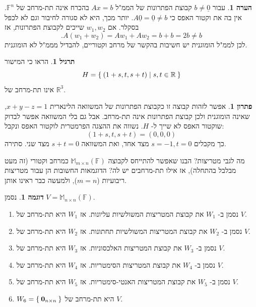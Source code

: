 \documentclass[12pt]{report}
\theoremstyle{plain}
\theoremstyle{definition}
\newtheorem{example}{דוגמה}[chapter]
\newtheorem{exercise}{תרגיל}[chapter]
\newtheorem{remark}{הערה}[chapter]
\newtheorem*{solution}{פתרון}
\newcommand{\R}{\mathbb{R}}
\newcommand{\F}{\mathbb{F}}
\newcommand{\M}{\mathbb{M}}
\newcommand{\0}{\mathbf{0}}
\begin{document}
\begin{remark}
עבור
$b\neq \underline{0}$
קבוצת הפתרונות של הממ"ל
$Ax=b$
בהכרח אינה תת-מרחב של
$\F^n$.
אין בה את וקטור האפס כי
$A\underline{0}=\underline{0}\neq b$.
יותר מכך, היא לא סגורה לחיבור וגם לא לכפל בסקלר. אם
$w_1,w_2$
שייכים לקבוצת הפתרונות, אז
$$
.A(w_1+w_2)=Aw_1+Aw_2=b+b=2b\neq b
$$
לכן לממ"ל הומוגנית יש חשיבות בהקשר של מרחב וקטוריים, להבדיל מממ"ל לא הומוגנית.
\end{remark}

\begin{exercise}
הראו כי המישור
$$
H=\Set{(1+s,t,s+t)|s,t\in\R}
$$
אינו תת-מרחב של
$\R^3$.
\end{exercise}

\begin{solution}
אפשר לזהות קבוצה זו כקבוצת הפתרונות של המשוואה הלינארית
$x+y-z=1$,
שאינה הומוגנית ולכן קבוצת הפתרונות אינה תת-מרחב. אבל גם בלי המשוואה אפשר לבדוק שוקטור האפס לא שייך ל-
$H$.
נשווה את ההצגה הפרמטרית לוקטור האפס ונקבל:
$$
(1+s,t,s+t)=(0,0,0)
$$
כך מקבלים 
$s=-1,t=0$
מצד אחד, ואת המשוואה
$s+t=0$
מצד שני. סתירה.
\end{solution}

מה לגבי מטריצות? הבנו שאפשר להתייחס לקבוצה
$\M_{m\times n}(\F)$
כמרחב וקטורי (זה מעט מבלבל בהתחלה), אז אילו תת-מרחבים יש לה? הדוגמאות החשובות הן עבור מטריצות ריבועיות 
($m=n$), 
ולמעשה כבר ראינו אותן.

\begin{example}
נסמן
$V=\M_{n\times n}(\F)$.
\begin{enumerate}[label=\alph*.]
\item 
נסמן ב-
$W_1$
את קבוצת המטריצות המשולשיות עליונות. אז 
$W_1$
היא תת-מרחב של
$V$.


\item 
נסמן ב-
$W_2$
את קבוצת המטריצות המשולשיות תחתונות. אז 
$W_2$
היא תת-מרחב של
$V$.


\item 
נסמן ב-
$W_3$
את קבוצת המטריצות האלכסוניות. אז 
$W_3$
היא תת-מרחב של
$V$.


\item 
נסמן ב-
$W_4$
את קבוצת המטריצות הסימטריות. אז 
$W_4$
היא תת-מרחב של
$V$.


\item 
נסמן ב-
$W_5$
את קבוצת המטריצות האנטי-סימטריות. אז 
$W_5$
היא תת-מרחב של
$V$.


\item 
$W_6=\Set{\0_{n\times n}}$
היא תת-מרחב של
$V$.


\end{enumerate}
\end{example}
\end{document}
